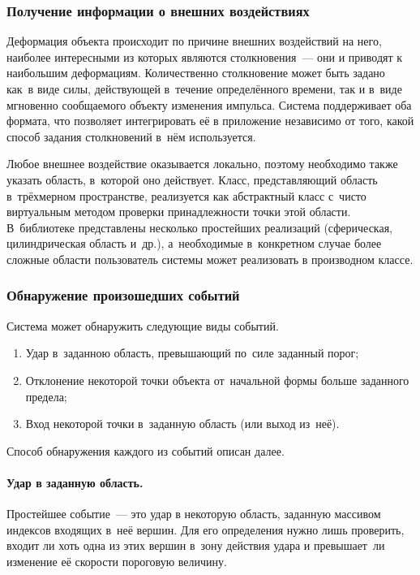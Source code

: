 \documentclass[a4paper, 14pt, titlepage]{extarticle}
\begin{document}
      \subsubsection{Получение информации о внешних воздействиях}\label{sssec:external_forces}

        Деформация объекта происходит по причине внешних воздействий на него, наиболее интересными
        из которых являются столкновения~--- они и приводят к наибольшим деформациям. Количественно
        столкновение может быть задано как~в виде силы, действующей в~течение определённого времени, так и
        в~виде мгновенно сообщаемого объекту изменения импульса.
        Система поддерживает оба формата, что позволяет интегрировать её в приложение независимо от
        того, какой способ задания столкновений в~нём используется.

        Любое внешнее воздействие оказывается локально, поэтому необходимо также указать область,
        в~которой оно действует. Класс, представляющий область в~трёхмерном пространстве,
        реализуется как абстрактный класс с~чисто виртуальным методом проверки принадлежности точки
        этой области. В~библиотеке представлены несколько простейших реализаций (сферическая,
        цилиндрическая область и~др.), а~необходимые в~конкретном случае более сложные области
        пользователь системы может реализовать в производном классе.

      \subsubsection{Обнаружение произошедших событий}

        Система может обнаружить следующие виды событий.
        \begin{enumerate}
          \item Удар в~заданною область, превышающий по~силе заданный порог;
          \item Отклонение некоторой точки объекта от~начальной формы больше заданного предела;
          \item Вход некоторой точки в~заданную область (или выход из~неё).
        \end{enumerate}
        Способ обнаружения каждого из событий описан далее.

        \paragraph{Удар в заданную область.}
        Простейшее событие~--- это удар в некоторую область, заданную массивом индексов
        входящих в~неё вершин. Для его определения нужно лишь проверить, входит ли хоть одна из этих
        вершин в~зону действия удара и превышает~ли изменение её скорости пороговую величину.
\end{document}
